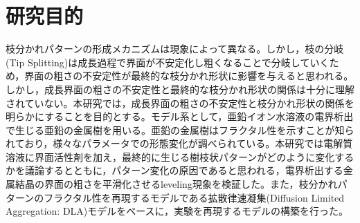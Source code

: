 \documentclass[autodetect-engine,dvi=dvipdfmx,a4paper,ja=standard]{bxjsbook}
\begin{document}

\thispagestyle{empty}

\restoregeometry
{}

\tableofcontents
{}





\section{研究目的}
枝分かれパターンの形成メカニズムは現象によって異なる。しかし，枝の分岐(Tip Splitting)は成長過程で界面が不安定化し粗くなることで分岐していくため，界面の粗さの不安定性が最終的な枝分かれ形状に影響を与えると思われる。しかし，成長界面の粗さの不安定性と最終的な枝分かれ形状の関係は十分に理解されていない。本研究では，成長界面の粗さの不安定性と枝分かれ形状の関係を明らかにすることを目的とする。モデル系として，亜鉛イオン水溶液の電界析出で生じる亜鉛の金属樹を用いる。亜鉛の金属樹はフラクタル性を示すことが知られており\cite{matsushita1984fractal}，様々なパラメータでの形態変化が調べられている\cite{suda2003temperature}。本研究では電解質溶液に界面活性剤を加え，最終的に生じる樹枝状パターンがどのように変化するかを議論するとともに，パターン変化の原因であると思われる，電界析出する金属結晶の界面の粗さを平滑化させるleveling現象を検証した。また，枝分かれパターンのフラクタル性を再現するモデルである拡散律速凝集(Diffusion Limited Aggregation: DLA)モデル\cite{witten1981diffusion}をベースに，実験を再現するモデルの構築を行った。



















\end{document}
